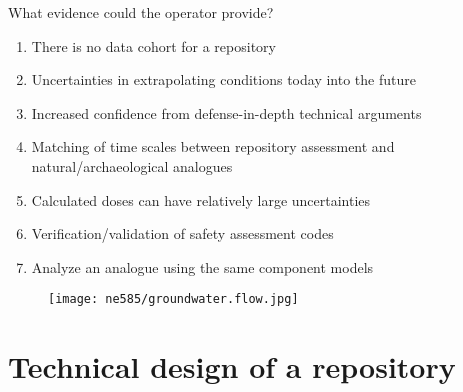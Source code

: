 \documentclass[aspectratio=1610,pdftex,dvipsnames,compress,xcolor={dvipsnames}]{beamer}
\begin{document}
\begin{frame}{What evidence could the operator provide?}
    \begin{enumerate}[series=outerlist,topsep=0pt,itemsep=21pt,leftmargin=*,label=(\arabic*)]
        \item[]There is no data cohort for a repository
        \item[]Uncertainties in extrapolating conditions today into the future
        \item[]Increased confidence from defense-in-depth technical arguments
        \item[]Matching of time scales between repository assessment and natural/archaeological analogues
        \item[]Calculated doses can have relatively large uncertainties
        \item[]Verification/validation of safety assessment codes 
        \item[]Analyze an analogue using the same component models
    \end{enumerate}
\end{frame}


\begin{frame}{}
    \begin{figure}
        \centering
        \texttt{[image: ne585/groundwater.flow.jpg]}
    \end{figure}
\end{frame}


\section{Technical design of a repository}
\end{document}
